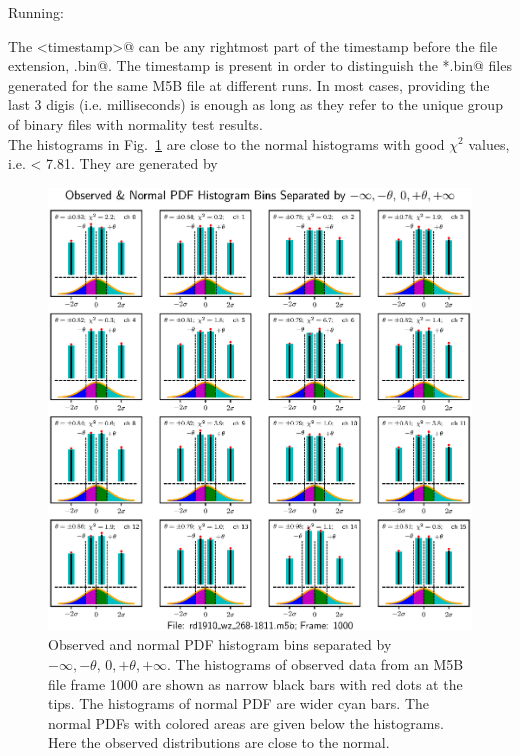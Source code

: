 \documentclass[letterpaper,twoside,12pt]{article}
\begin{document}
\noindent Running: \\

\noindent \verb@%run inspect_nt.py <m5b_filename> <timestamp> <start_frame_#> <#_of_frames> @ \\

The \verb@<timestamp>@ can be any rightmost part of the timestamp before the file extension, \verb@.bin@. The timestamp is present in order to distinguish the \verb@*.bin@ files generated for the same M5B file at different runs. In most cases, providing the last 3 digis (i.e. milliseconds) is enough as long as they refer to the unique group of binary files with normality test results. \\

The histograms in Fig.~\ref{hists_good_4x4} are close to the normal histograms with good $\chi^2$ values, i.e. < 7.81. They are generated by \\

\noindent \verb@%run inspect_nt.py rd1910_wz_268-1811.m5b 575 1000 1@. \\

\begin{figure}[ht!]
  \begin{center}
  \includegraphics[width=35pc]{fig_4x4_Histograms_good.eps}
  \caption{\small Observed and normal PDF histogram bins separated by $-\infty, -\theta, \, 0, +\theta, +\infty$. The histograms of observed data from an M5B file frame 1000 are shown as narrow black bars with red dots at the tips. The histograms of normal PDF are wider cyan bars. The normal PDFs with colored areas are given below the histograms. Here the observed distributions are close to the normal.}
  \label{hists_good_4x4}
  \end{center}
\end{figure}
\end{document}
